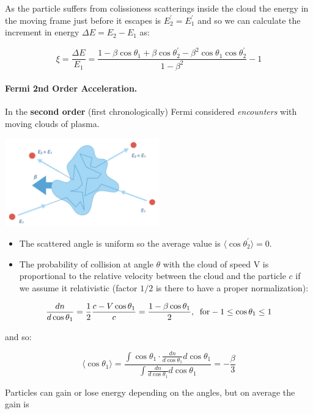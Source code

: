 \documentclass[
  letterpaper,
  DIV=11,
  numbers=noendperiod]{scrreprt}
\let\oldparagraph\paragraph
\renewcommand{\paragraph}[1]{\oldparagraph{#1}\mbox{}}
\begin{document}
As the particle suffers from colissioness scatterings inside the cloud
the energy in the moving frame just before it escapes is
\(E_2^\prime = E_1^\prime\) and so we can calculate the increment in
energy \(\Delta E = E_2 - E_1\) as:

\[\xi = \frac{\Delta E}{E_1}  = \frac{1 - \beta \cos \theta_1 + \beta\cos\theta_2^\prime - \beta^2\cos\theta_1\cos\theta_2^\prime}{1 - \beta^2} -1\]

\paragraph{Fermi 2nd Order
Acceleration.}\label{fermi-2nd-order-acceleration.}

In the \textbf{second order} (first chronologically) Fermi considered
\emph{encounters} with moving clouds of plasma.

\begin{center}
\includegraphics[width=0.5\textwidth,height=\textheight]{images/Fermi2nd.jpg}
\end{center}

\begin{itemize}
\item
  The scattered angle is uniform so the average value is
  \(\langle \cos\theta_2^\prime\rangle = 0\).
\item
  The probability of collision at angle \(\theta\) with the cloud of
  speed V is proportional to the relative velocity between the cloud and
  the particle \(c\) if we assume it relativistic (factor \(1/2\) is
  there to have a proper normalization):
\end{itemize}

\[\frac{dn}{d\cos \theta_1} = \frac{1}{2}\frac{c - V\cos\theta_1}{c}=\frac{1 -\beta \cos\theta_1}{2}, {\;\; \rm for -1 \leq \cos\theta_1 \leq 1}\]

and so:

\[\langle \cos\theta_1\rangle = \frac{\int \cos\theta_1 \cdot \frac{dn}{d\cos\theta_1} d\cos\theta_1}{\int \frac{dn}{d\cos\theta_1}d\cos\theta_1} = - \frac{\beta}{3}\]

Particles can gain or lose energy depending on the angles, but on
average the gain is
\end{document}
